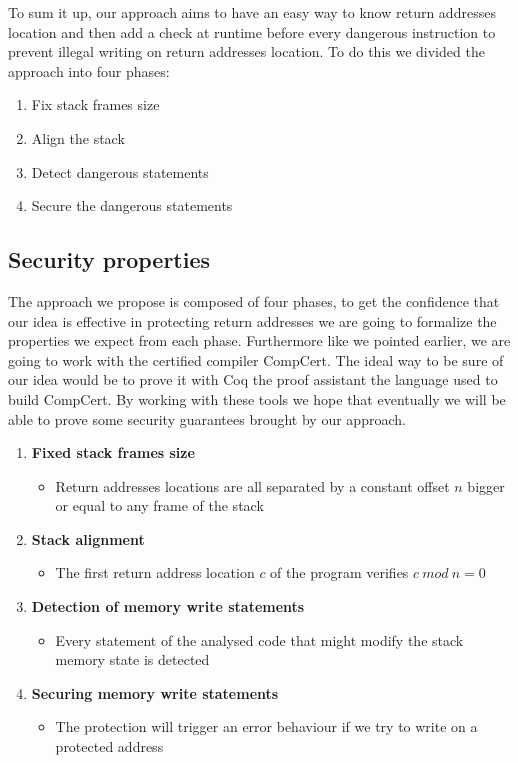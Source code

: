\documentclass[11pt]{sdm}
\begin{document}
\hfill \break 
	To sum it up, our approach aims to have an easy way to know return addresses location and then add a check at runtime before every dangerous instruction to prevent illegal writing on return addresses location.
To do this we divided the approach into four phases:
\begin{enumerate}
	\item Fix stack frames size
	\item Align the stack
	\item Detect dangerous statements
	\item Secure the dangerous statements
\end{enumerate}


\subsection{Security properties}
\label{sub:Security properties}
	The approach we propose is composed of four phases, to get the confidence that our idea is effective in protecting return addresses we are going to formalize the properties we expect from each phase. 
Furthermore like we pointed earlier, we are going to work with the certified compiler CompCert.
The ideal way to be sure of our idea would be to prove it with Coq the proof assistant the language used to build CompCert.
By working with these tools we hope that eventually we will be able to prove some security guarantees brought by our approach.

\begin{enumerate}
	\item \textbf{Fixed stack frames size}
		\begin{itemize}
			\item Return addresses locations are all separated by a constant offset $n$ bigger or equal to any frame of the stack
		\end{itemize}
	\item \textbf{Stack alignment}
		\begin{itemize}
			\item The first return address location $c$ of the program verifies $c~mod~n=0$
		\end{itemize}
	\item \textbf{Detection of memory write statements}
		\begin{itemize}
			\item Every statement of the analysed code that might modify the stack memory state is detected
		\end{itemize}
	\item \textbf{Securing memory write statements}
		\begin{itemize}
			\item The protection will trigger an error behaviour if we try to write on a protected address
		\end{itemize}
\end{enumerate}
\end{document}
